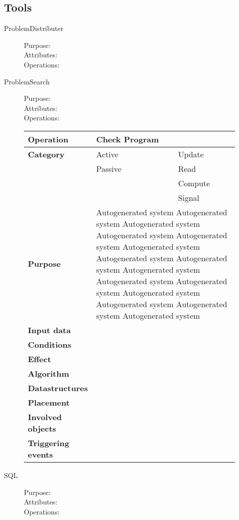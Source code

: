 \subsection{Tools}

\begin{description}
\item[ProblemDistributer]\hfill
\begin{description}
\item[Purpose:]
\item[Attributes:]
\item[Operations:]
\end{description}
\end{description}

\begin{description}
\item[ProblemSearch]\hfill
\begin{description}
\item[Purpose:]
\item[Attributes:]
\item[Operations:]
\end{description}
\end{description}

\begin{figure}
\begin{tabular}{p{3cm} p{4.25cm} p{4.25cm}}
\hline
\textbf{Operation}&Check Program\\
\hline
\textbf{Category}&\underline{ }Active&\underline{ }Update\\
&\underline{ }Passive&\underline{ }Read\\
&&\underline{ }Compute\\
&&\underline{ }Signal\\
\textbf{Purpose}&\multicolumn{2}{p{8.5cm}}{Autogenerated system Autogenerated system Autogenerated system Autogenerated system Autogenerated system Autogenerated system
Autogenerated system Autogenerated system Autogenerated system Autogenerated system Autogenerated system Autogenerated system 
Autogenerated system Autogenerated system Autogenerated system}\\
\textbf{Input data}&\multicolumn{2}{p{8.5cm}}{}\\
\textbf{Conditions}&\multicolumn{2}{p{8.5cm}}{}\\
\textbf{Effect}&\multicolumn{2}{p{8.5cm}}{}\\
\textbf{Algorithm}&\multicolumn{2}{p{8.5cm}}{}\\
\textbf{Datastructures}&\multicolumn{2}{p{8.5cm}}{}\\
\textbf{Placement}&\multicolumn{2}{p{8.5cm}}{}\\
\textbf{Involved objects}&\multicolumn{2}{p{8.5cm}}{}\\
\textbf{Triggering events}&\multicolumn{2}{p{8.5cm}}{}\\
\hline
\end{tabular}
\end{figure}


\begin{description}
\item[SQL]\hfill
\begin{description}
\item[Purpose:]
\item[Attributes:]
\item[Operations:]
\end{description}
\end{description}